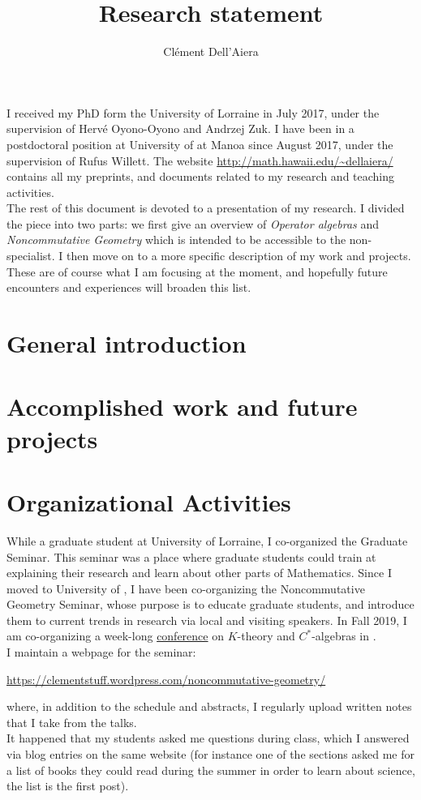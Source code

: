 \documentclass[a4paper]{article}
\title{Research statement}
\date{}
\author{ Cl\'ement Dell'Aiera}
\begin{document}
\maketitle

I received my PhD form the University of Lorraine in July 2017, under the supervision of Herv\'e Oyono-Oyono and Andrzej Zuk. I have been in a postdoctoral position at University of \Hawaii  at Manoa since August 2017, under the supervision of Rufus Willett. The website \url{http://math.hawaii.edu/~dellaiera/} contains all my preprints, and documents related to my research and teaching activities.\\ 

The rest of this document is devoted to a presentation of my research. I divided the piece into two parts: we first give an overview of \textit{Operator algebras} and \textit{Noncommutative Geometry} which is intended to be accessible to the non-specialist. I then move on to a more specific description of my work and projects. These are of course what I am focusing at the moment, and hopefully future encounters and experiences will broaden this list.

\section{General introduction}


\section{Accomplished work and future projects}


\section{Organizational Activities}

While a graduate student at University of Lorraine, I co-organized the Graduate Seminar. This seminar was a place where graduate students could train at explaining their research and learn about other parts of Mathematics. Since I moved to University of \Hawaii, I have been co-organizing the Noncommutative Geometry Seminar, whose purpose is to educate graduate students, and introduce them to current trends in research via local and visiting speakers. In Fall 2019, I am co-organizing a week-long \href{http://math.hawaii.edu/~dellaiera/Conference.html}{conference} on $K$-theory and $C^*$-algebras in \Hawaii. \\

I maintain a webpage for the seminar:
\begin{center}
\url{https://clementstuff.wordpress.com/noncommutative-geometry/}
\end{center}
where, in addition to the schedule and abstracts, I regularly upload written notes that I take from the talks. \\

It happened that my students asked me questions during class, which I answered via blog entries on the same website (for instance one of the sections asked me for a list of books they could read during the summer in order to learn about science, the list is the first post).
 
 
\end{document}
